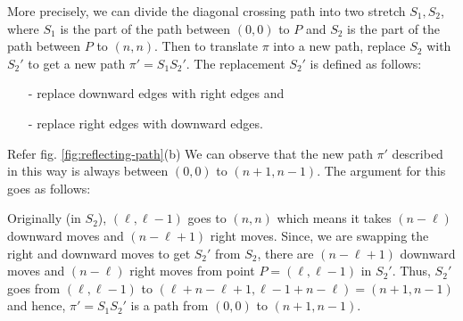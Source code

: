 More precisely, we can divide the diagonal crossing path into two stretch $S_1, S_2$, where $S_1$ is the part of the path between $(0,0)$ to $P$ and $S_2$ is the part of the path between $P$  to $(n,n)$. 
Then to translate $\pi$ into a new path, replace $S_2$ with $S_2'$  to get a new path $\pi' = S_1S_2'$. The replacement $S_2'$ is defined as follows:
\begin{itemize}
    \item[-] replace downward edges with right edges and 
    \item[-] replace right edges with downward edges.
\end{itemize} Refer fig. \ref{fig:reflecting-path}(b)
We can observe that the new path $\pi'$ described in this way is always between $(0,0)$ to $(n+1, n-1)$. The argument for this goes as follows:

Originally (in $S_2$), $(\ell, \ell-1)$ goes to $(n,n)$ which means it takes $(n-\ell)$ downward moves and $(n-\ell+1)$ right moves. Since, we are swapping the right and downward moves to get $S_2'$ from $S_2$, there are $(n-\ell+1)$ downward moves and $(n-\ell)$ right moves from point $P=(\ell, \ell-1)$ in $S_2'$. Thus, $S_2'$ goes from $(\ell, \ell-1)$ to $(\ell+n-\ell+1, \ell-1+n-\ell) = (n+1, n-1)$ and hence, $\pi' = S_1S_2'$ is a path from $(0,0)$ to $(n+1, n-1)$. 

